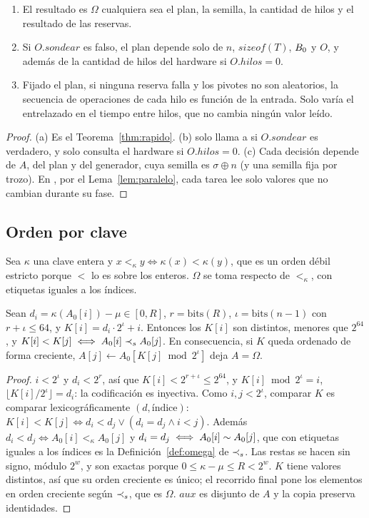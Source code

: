 \begin{teorema}[Determinismo]\label{thm:det}
\begin{enumerate}[label=(\alph*),nosep]
\item El resultado es $\Omega$ cualquiera sea el plan, la semilla, la cantidad de hilos
  y el resultado de las reservas.
\item Si $O.\mathit{sondear}$ es falso, el plan depende solo de $n$,
  $\mathit{sizeof}(T)$, $B_0$ y $O$, y además de la cantidad de hilos del hardware si
  $O.\mathit{hilos}=0$.
\item Fijado el plan, si ninguna reserva falla y los pivotes no son aleatorios, la
  secuencia de operaciones de cada hilo es función de la entrada. Solo varía el
  entrelazado en el tiempo entre hilos, que no cambia ningún valor leído.
\end{enumerate}
\end{teorema}
\begin{proof}
(a) Es el Teorema~\ref{thm:rapido}. (b) \PlanF solo llama a \Disp si
$O.\mathit{sondear}$ es verdadero, y solo consulta el hardware si $O.\mathit{hilos}=0$.
(c) Cada decisión depende de $A$, del plan y del generador, cuya semilla es
$\sigma\oplus n$ (y una semilla fija por trozo). En \Paralelo, por el
Lema~\ref{lem:paralelo}, cada tarea lee solo valores que no cambian durante su fase.
\end{proof}

\subsection{Orden por clave}

Sea $\kappa$ una clave entera y $x\lt_\kappa y\iff\kappa(x)<\kappa(y)$, que es un orden
débil estricto porque $<$ lo es sobre los enteros. $\Omega$ se toma respecto de
$\lt_\kappa$, con etiquetas iguales a los índices.

\begin{lema}\label{lem:indirecto}
Sean $d_i=\kappa(A_0[i])-\mu\in[0,R]$, $r=\mathrm{bits}(R)$, $\iota=\mathrm{bits}(n-1)$
con $r+\iota\le 64$, y $K[i]=d_i\cdot2^\iota+i$. Entonces los $K[i]$ son distintos,
menores que $2^{64}$, y $K[i]<K[j]\iff A_0[i]\prec_{s} A_0[j]$. En consecuencia, si $K$ queda
ordenado de forma creciente, $A[j]\gets A_0[K[j]\bmod 2^\iota]$ deja $A=\Omega$.
\end{lema}
\begin{proof}
$i<2^\iota$ y $d_i<2^r$, así que $K[i]<2^{r+\iota}\le2^{64}$, y $K[i]\bmod2^\iota=i$,
$\lfloor K[i]/2^\iota\rfloor=d_i$: la codificación es inyectiva. Como $i,j<2^\iota$,
comparar $K$ es comparar lexicográficamente $(d,\text{índice})$:
$K[i]<K[j]\iff d_i<d_j\vee(d_i=d_j\wedge i<j)$. Además $d_i<d_j\iff A_0[i]\lt_\kappa
A_0[j]$ y $d_i=d_j\iff A_0[i]\sim A_0[j]$, que con etiquetas iguales a los índices es la
Definición~\ref{def:omega} de $\prec_{s}$. Las restas se hacen sin signo, módulo $2^w$, y son
exactas porque $0\le\kappa-\mu\le R<2^w$. $K$ tiene valores distintos, así que su orden
creciente es único; el recorrido final pone los elementos en orden creciente según
$\prec_{s}$, que es $\Omega$. $\mathit{aux}$ es disjunto de $A$ y la copia preserva
identidades.
\end{proof}

